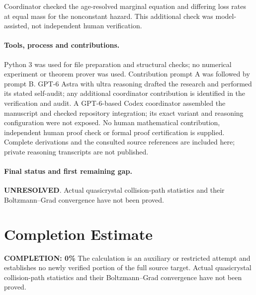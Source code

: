 \documentclass[11pt]{article}
\begin{document}
Coordinator checked the age-resolved marginal equation and differing loss rates at equal mass for the nonconstant hazard. This additional check was model-assisted, not independent human verification.

\paragraph{Tools, process and contributions.}
Python 3 was used for file preparation and structural checks; no numerical experiment or theorem prover was used. Contribution prompt A was followed by prompt B. GPT-6 Astra with ultra reasoning drafted the research and performed its stated self-audit; any additional coordinator contribution is identified in the verification and audit. A GPT-6-based Codex coordinator assembled the manuscript and checked repository integration; its exact variant and reasoning configuration were not exposed. No human mathematical contribution, independent human proof check or formal proof certification is supplied. Complete derivations and the consulted source references are included here; private reasoning transcripts are not published.

\paragraph{Final status and first remaining gap.}
\textbf{UNRESOLVED}. Actual quasicrystal collision-path statistics and their Boltzmann–Grad convergence have not been proved.

\section{Completion Estimate}
\noindent\textbf{COMPLETION: 0\%}
The calculation is an auxiliary or restricted attempt and establishes no newly verified portion of the full source target. Actual quasicrystal collision-path statistics and their Boltzmann–Grad convergence have not been proved.
\end{document}
